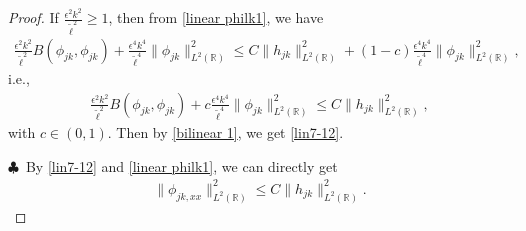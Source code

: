 \documentclass[10pt, reqno]{amsart}
\numberwithin{equation}{section}
\theoremstyle{definition}
\begin{document}
{{\begin{proof}
\noindent If $ \frac{\epsilon^2k^2}{{\tilde\ell}^2} \geq 1$, then from \eqref{linear philk1}, we have
\begin{align*}
 \frac{\epsilon^2k^2}{{\tilde\ell}^2} B(\phi_{jk}, \phi_{jk}) + \frac{\epsilon^4k^4}{{\tilde\ell}^4} \|\phi_{jk}\|^2_{L^2({\mathbb R})} \leq C\|h_{jk}\|^2_{L^2({\mathbb R})} + (1-c)\frac{\epsilon^4k^4}{{\tilde\ell}^4} \|\phi_{jk}\|^2_{L^2({\mathbb R})},
\end{align*}
 i.e.,
\begin{align*}
 \frac{\epsilon^2k^2}{{\tilde\ell}^2} B(\phi_{jk}, \phi_{jk}) + c\frac{\epsilon^4k^4}{{\tilde\ell}^4} \|\phi_{jk}\|^2_{L^2({\mathbb R})} \leq C\|h_{jk}\|^2_{L^2({\mathbb R})},
\end{align*}
with $c\in (0, 1)$.
 Then by \eqref{bilinear 1}, we get \eqref{lin7-12}.

\smallskip\noindent$\clubsuit$\
By \eqref{lin7-12} and \eqref{linear philk1}, we can directly get
\begin{align}\label{second order estiamte}
\|\phi_{jk, xx}\|^2_{L^2({\mathbb R})} \leq C\|h_{jk}\|^2_{L^2({\mathbb R})}.
\end{align}



\end{proof}}}
\end{document}
